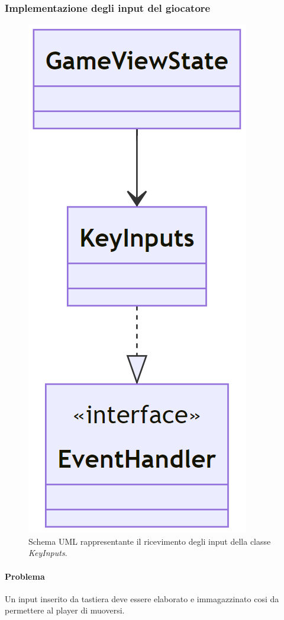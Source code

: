 \documentclass[a4paper,12pt]{report}
\begin{document}
\subsubsection{Implementazione degli input del giocatore}
\begin{figure}[H]
\centering{}
\includegraphics[scale = 0.5]{img/KeyInputsUML.PNG}
\caption{Schema UML rappresentante il ricevimento degli input della classe \emph{KeyInputs}.}
\end{figure}
\paragraph{Problema}
    Un input inserito da tastiera deve essere elaborato e immagazzinato cosi da permettere al player di muoversi.
\end{document}
